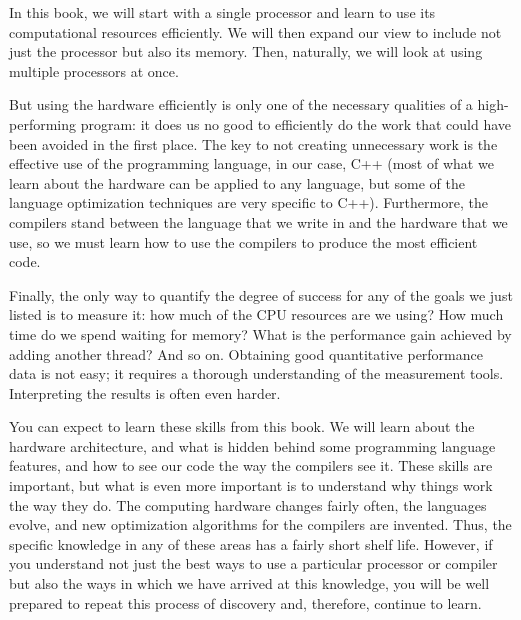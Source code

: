 In this book, we will start with a single processor and learn to use its computational resources efficiently. We will then expand our view to include not just the processor but also its memory. Then, naturally, we will look at using multiple processors at once.

But using the hardware efficiently is only one of the necessary qualities of a high-performing program: it does us no good to efficiently do the work that could have been avoided in the first place. The key to not creating unnecessary work is the effective use of the programming language, in our case, C++ (most of what we learn about the hardware can be applied to any language, but some of the language optimization techniques are very specific to C++). Furthermore, the compilers stand between the language that we write in and the hardware that we use, so we must learn how to use the compilers to produce the most efficient code.

Finally, the only way to quantify the degree of success for any of the goals we just listed is to measure it: how much of the CPU resources are we using? How much time do we spend waiting for memory? What is the performance gain achieved by adding another thread? And so on. Obtaining good quantitative performance data is not easy; it requires a thorough understanding of the measurement tools. Interpreting the results is often even harder.

You can expect to learn these skills from this book. We will learn about the hardware architecture, and what is hidden behind some programming language features, and how to see our code the way the compilers see it. These skills are important, but what is even more important is to understand why things work the way they do. The computing hardware changes fairly often, the languages evolve, and new optimization algorithms for the compilers are invented. Thus, the specific knowledge in any of these areas has a fairly short shelf life. However, if you understand not just the best ways to use a particular processor or compiler but also the ways in which we have arrived at this knowledge, you will be well prepared to repeat this process of discovery and, therefore, continue to learn.
































